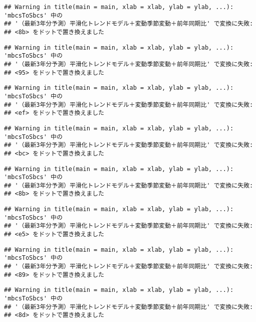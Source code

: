 \documentclass[]{article}
\begin{document}
\begin{verbatim}
## Warning in title(main = main, xlab = xlab, ylab = ylab, ...): 'mbcsToSbcs' 中の
## '（最新3年分予測）平滑化トレンドモデル＋変動季節変動＋前年同期比' で変換に失敗:
## <8b> をドットで置き換えました
\end{verbatim}

\begin{verbatim}
## Warning in title(main = main, xlab = xlab, ylab = ylab, ...): 'mbcsToSbcs' 中の
## '（最新3年分予測）平滑化トレンドモデル＋変動季節変動＋前年同期比' で変換に失敗:
## <95> をドットで置き換えました
\end{verbatim}

\begin{verbatim}
## Warning in title(main = main, xlab = xlab, ylab = ylab, ...): 'mbcsToSbcs' 中の
## '（最新3年分予測）平滑化トレンドモデル＋変動季節変動＋前年同期比' で変換に失敗:
## <ef> をドットで置き換えました
\end{verbatim}

\begin{verbatim}
## Warning in title(main = main, xlab = xlab, ylab = ylab, ...): 'mbcsToSbcs' 中の
## '（最新3年分予測）平滑化トレンドモデル＋変動季節変動＋前年同期比' で変換に失敗:
## <bc> をドットで置き換えました
\end{verbatim}

\begin{verbatim}
## Warning in title(main = main, xlab = xlab, ylab = ylab, ...): 'mbcsToSbcs' 中の
## '（最新3年分予測）平滑化トレンドモデル＋変動季節変動＋前年同期比' で変換に失敗:
## <8b> をドットで置き換えました
\end{verbatim}

\begin{verbatim}
## Warning in title(main = main, xlab = xlab, ylab = ylab, ...): 'mbcsToSbcs' 中の
## '（最新3年分予測）平滑化トレンドモデル＋変動季節変動＋前年同期比' で変換に失敗:
## <e5> をドットで置き換えました
\end{verbatim}

\begin{verbatim}
## Warning in title(main = main, xlab = xlab, ylab = ylab, ...): 'mbcsToSbcs' 中の
## '（最新3年分予測）平滑化トレンドモデル＋変動季節変動＋前年同期比' で変換に失敗:
## <89> をドットで置き換えました
\end{verbatim}

\begin{verbatim}
## Warning in title(main = main, xlab = xlab, ylab = ylab, ...): 'mbcsToSbcs' 中の
## '（最新3年分予測）平滑化トレンドモデル＋変動季節変動＋前年同期比' で変換に失敗:
## <8d> をドットで置き換えました
\end{verbatim}
\end{document}
